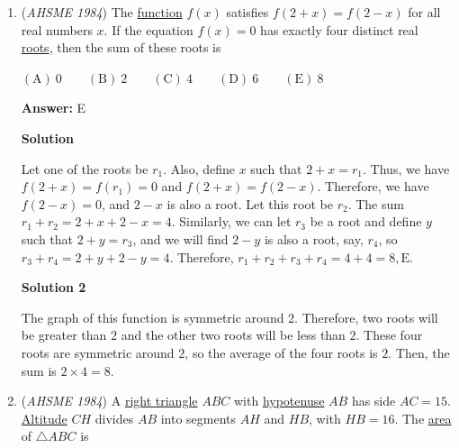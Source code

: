 \begin{enumerate}
 



\textbf{Solution 2}

We can simply try the answers. We quickly see that $18^\circ$ works, since $\sin(36^\circ)\sin(54^\circ)=\cos(54^\circ)\cos(36^\circ)=\cos(36^\circ)\cos(54^\circ)$ by the identity $\cos(x)=\sin(90^\circ-x)$




\textbf{Solution 3}

Start by subtracting $\sin{2x}\sin{3x}$ from both sides to get $\cos{2x}\cos{3x}-\sin{2x}\sin{3x}=0$. We recognize that this is of the form $\cos{a}\cos{b}-\sin{a}\sin{b}=\cos{(a+b)}$, so $\cos{2x}\cos{3x}-\sin{2x}\sin{3x}=\cos{(2x+3x)}=0$. $\cos{90^\circ}=0$, so $x=\boxed{18^\circ}$.

 


	\item (\textit{AHSME 1984}) The \href{https://artofproblemsolving.com/wiki/index.php?title=Function}{function} $f(x)$ satisfies $f(2+x)=f(2-x)$ for all real numbers $x$. If the equation $f(x)=0$ has exactly four distinct real \href{https://artofproblemsolving.com/wiki/index.php?title=Root\_(polynomial)}{roots}, then the sum of these roots is


 $\mathrm{(A) \ }0 \qquad \mathrm{(B) \ }2 \qquad \mathrm{(C) \ } 4 \qquad \mathrm{(D) \ }6 \qquad \mathrm{(E) \ } 8$

 \textbf{Answer: }E



\textbf{Solution}

Let one of the roots be $r_1$. Also, define $x$ such that $2+x=r_1$. Thus, we have $f(2+x)=f(r_1)=0$ and $f(2+x)=f(2-x)$. Therefore, we have $f(2-x)=0$, and $2-x$ is also a root. Let this root be $r_2$. The sum $r_1+r_2=2+x+2-x=4$. Similarly, we can let $r_3$ be a root and define $y$ such that $2+y=r_3$, and we will find $2-y$ is also a root, say, $r_4$, so $r_3+r_4=2+y+2-y=4$. Therefore, $r_1+r_2+r_3+r_4=4+4=8, \boxed{\text{E}}$.

 



\textbf{Solution 2}

The graph of this function is symmetric around 2. Therefore, two roots will be greater than $2$ and the other two roots will be less than $2$. These four roots are symmetric around $2$, so the average of the four roots is $2$. Then, the sum is $2\times4=8$.

 


	\item (\textit{AHSME 1984}) A \href{https://artofproblemsolving.com/wiki/index.php?title=Right\_triangle}{right triangle} $ABC$ with \href{https://artofproblemsolving.com/wiki/index.php?title=Hypotenuse}{hypotenuse} $AB$ has side $AC=15$. \href{https://artofproblemsolving.com/wiki/index.php?title=Altitude}{Altitude} $CH$ divides $AB$ into segments $AH$ and $HB$, with $HB=16$. The \href{https://artofproblemsolving.com/wiki/index.php?title=Area}{area} of $\triangle ABC$ is



\end{enumerate}

